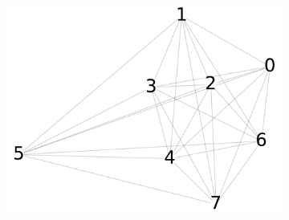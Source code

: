 \documentclass[10pt]{beamer}
\begin{document}
\begin{frame}[fragile]{}
\begin{figure}[ht]
\begin{subfigure}{.33 \linewidth}
{    \includegraphics[scale=0.15]{persistence_diagrams/distances/graphs/bottleneck_h2_graph.pdf}
    }
  \end{subfigure}


\end{figure}
\end{frame}
\end{document}
